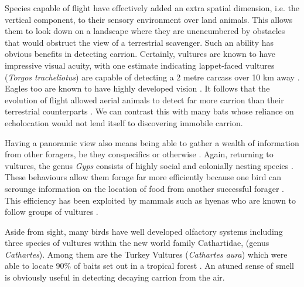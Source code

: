 \documentclass[a4paper,12pt]{article}
\begin{document}
Species capable of flight have effectively added an extra spatial dimension, i.e. the vertical component, to their sensory environment over land animals.
This allows them to look down on a landscape where they are unencumbered by obstacles that would obstruct the view of a terrestrial scavenger.
Such an ability has obvious benefits in detecting carrion.
Certainly, vultures are known to have impressive visual acuity, with one estimate indicating lappet-faced vultures %
 (\textit{Torgos tracheliotus}) are capable of detecting a 2 metre carcass over 10 km away \citep{spiegel2013factors}.
Eagles too are known to have highly developed vision \citep{reymond1985spatial}.
It follows that the evolution of flight allowed aerial animals to detect far more carrion than their terrestrial counterparts \citep{AR:AR22815}.
We can contrast this with many bats whose reliance on echolocation would not lend itself to discovering immobile carrion.
% 


Having a panoramic view also means being able to gather a wealth of information from other foragers, be they conspecifics or otherwise \citep{jackson2008effect}.
Again, returning to vultures, the genus \textit{Gyps} consists of highly social and colonially nesting species \citep{fernandez2015density}.
These behaviours allow them forage far more efficiently because one bird can scrounge information on the location of food from another successful forager \citep{KaneVul}.
This efficiency has been exploited by mammals such as hyenas who are known to follow groups of vultures \citep{jones2015african}. 



Aside from sight, many birds have well developed olfactory systems \citep{AR:AR22815} including three species of vultures within the new world family Cathartidae, (genus \textit{Cathartes}).
Among them are the Turkey Vultures (\textit{Cathartes aura}) which were able to locate 90\% of baits set out in a tropical forest \citep{houston1986olfaction}.
An atuned sense of smell is obviously useful in detecting decaying carrion from the air.
\end{document}

